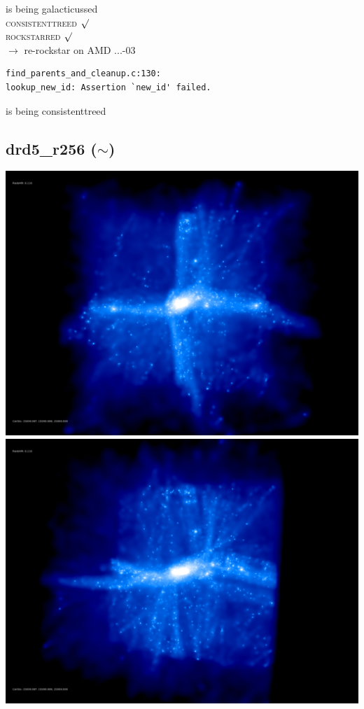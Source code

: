 is being galacticussed \\
\textsc{consistenttreed} $\surd$ \\
\textsc{rockstarred} $\surd$ \\
$\rightarrow$  re-rockstar on AMD ...-03 \\
\begin{verbatim}
find_parents_and_cleanup.c:130: 
lookup_new_id: Assertion `new_id' failed.
\end{verbatim}
is being consistenttreed \\ 

% 
%
%
%
%
%
%
%

\newpage

\subsection{drd5\_r256 ($\sim$)} 

\includegraphics[scale=0.12]{drd5_r256/rotate_1.png} 
\includegraphics[scale=0.12]{drd5_r256/rotate_2.png} \\

